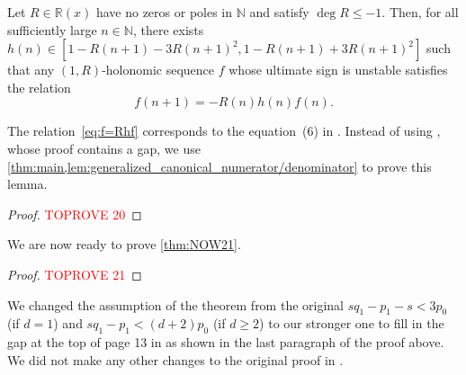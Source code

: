\documentclass[a4paper,UKenglish,cleveref,autoref,thm-restate]{lipics-v2021}
\newcommand{\R}{\mathbb{R}}
\newcommand{\N}{\mathbb{N}}
\begin{document}
\begin{lemma}\label{lem:NOW21}
Let $R \in \R(x)$ have no zeros or poles in $\N$ and satisfy $\deg R \leq -1$. Then, for all sufficiently large $n \in \N$, there exists $h(n) \in [ 1-R(n+1) - 3R(n+1)^2, 1-R(n+1) + 3R(n+1)^2 ]$ such that any $(1, R)$-holonomic sequence $f$ whose ultimate sign is unstable satisfies the relation
\begin{equation}\label{eq:f=Rhf}
f(n+1) = - R(n)h(n) f(n). 
\end{equation}
\end{lemma}

The relation~\eqref{eq:f=Rhf} corresponds to the equation~(6) in \cite{NOW21}.
Instead of using \cite[Lemma 14]{NOW21}, whose proof contains a gap, we use \cref{thm:main,lem:generalized_canonical_numerator/denominator} to prove this lemma. 


\begin{proof}\textcolor{red}{TOPROVE 20}\end{proof}

We are now ready to prove \cref{thm:NOW21}. 



\begin{proof}\textcolor{red}{TOPROVE 21}\end{proof}

We changed the assumption of the theorem from the original $s q_1 - p_1 - s < 3 p_0$ (if $d = 1$) and $s q_1 - p_1 < (d+2) p_0$ (if $d \geq 2$) to our stronger one to fill in the gap at the top of page 13 in \cite{NOW21} as shown in the last paragraph of the proof above.
We did not make any other changes to the original proof in \cite[\S~3.3]{NOW21}.












\end{document}
